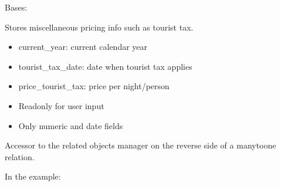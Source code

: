 \documentclass[letterpaper,10pt,english]{sphinxmanual}
\begin{document}
\begin{fulllineitems}
\label{\detokenize{index:bookings.models.OtherPrice}}
\pysigstartsignatures
\pysiglinewithargsret
{}
{\sphinxparamcomma {}}
{}
\pysigstopsignatures
\sphinxAtStartPar
Bases: 

\sphinxAtStartPar
Stores miscellaneous pricing info such as tourist tax.
\begin{description}
\begin{itemize}
\item {} 
\sphinxAtStartPar
current\_year: current calendar year

\item {} 
\sphinxAtStartPar
tourist\_tax\_date: date when tourist tax applies

\item {} 
\sphinxAtStartPar
price\_tourist\_tax: price per night/person

\end{itemize}

\begin{itemize}
\item {} 
\sphinxAtStartPar
Read\sphinxhyphen{}only for user input

\item {} 
\sphinxAtStartPar
Only numeric and date fields

\end{itemize}

\end{description}

\begin{fulllineitems}
\label{\detokenize{index:bookings.models.OtherPrice.translations}}
\pysigstartsignatures
\pysigline
{}
\pysigstopsignatures
\sphinxAtStartPar
Accessor to the related objects manager on the reverse side of a
many\sphinxhyphen{}to\sphinxhyphen{}one relation.

\sphinxAtStartPar
In the example:

\begin{sphinxVerbatim}[commandchars=\\\{\}]
       
\end{sphinxVerbatim}


\end{fulllineitems}
\end{fulllineitems}
\end{document}
